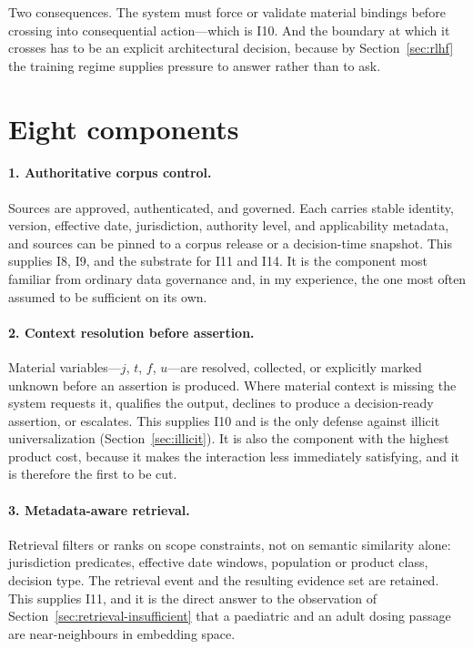Two consequences. The system must force or validate material bindings before
crossing into consequential action---which is I10. And the boundary at which it
crosses has to be an explicit architectural decision, because by
Section~\ref{sec:rlhf} the training regime supplies pressure to answer rather than
to ask.

\section{Eight components}

\paragraph{1. Authoritative corpus control.} Sources are approved, authenticated,
and governed. Each carries stable identity, version, effective date, jurisdiction,
authority level, and applicability metadata, and sources can be pinned to a corpus
release or a decision-time snapshot. This supplies I8, I9, and the substrate for
I11 and I14. It is the component most familiar from ordinary data governance and,
in my experience, the one most often assumed to be sufficient on its own.

\paragraph{2. Context resolution before assertion.} Material variables---$j$, $t$,
$f$, $u$---are resolved, collected, or explicitly marked unknown before an
assertion is produced. Where material context is missing the system requests it,
qualifies the output, declines to produce a decision-ready assertion, or escalates.
This supplies I10 and is the only defense against illicit universalization
(Section~\ref{sec:illicit}). It is also the component with the highest product cost,
because it makes the interaction less immediately satisfying, and it is therefore
the first to be cut.

\paragraph{3. Metadata-aware retrieval.} Retrieval filters or ranks on scope
constraints, not on semantic similarity alone: jurisdiction predicates, effective
date windows, population or product class, decision type. The retrieval event and
the resulting evidence set are retained. This supplies I11, and it is the direct
answer to the observation of Section~\ref{sec:retrieval-insufficient} that a
paediatric and an adult dosing passage are near-neighbours in embedding space.

